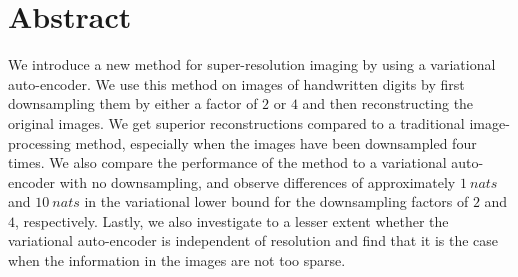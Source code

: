\section*{Abstract}
\label{sec:abstract}

We introduce a new method for super-resolution imaging by using a variational auto-encoder.
We use this method on images of handwritten digits by first downsampling them by either a factor of $2$ or $4$ and then reconstructing the original images.
We get superior reconstructions compared to a traditional image-processing method, especially when the images have been downsampled four times.
We also compare the performance of the method to a variational auto-encoder with no downsampling, and observe differences of approximately $\SI{1}{nats}$ and $\SI{10}{nats}$ in the variational lower bound for the downsampling factors of $2$ and $4$, respectively.
Lastly, we also investigate to a lesser extent whether the variational auto-encoder is independent of resolution and find that it is the case when the information in the images are not too sparse.
